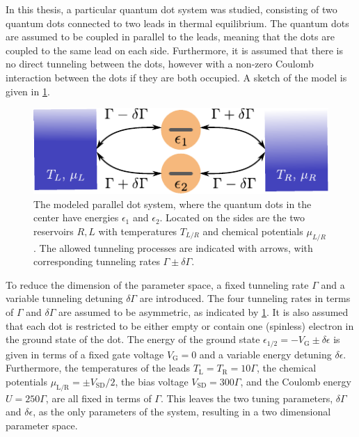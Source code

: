 \documentclass[../main.tex]{subfiles}
\begin{document}
In this thesis, a particular quantum dot system was studied, consisting of two quantum dots connected to two leads in thermal equilibrium. The quantum dots are assumed to be coupled in parallel to the leads, meaning that the dots are coupled to the same lead on each side. Furthermore, it is assumed that there is no direct tunneling between the dots, however with a non-zero Coulomb interaction between the dots if they are both occupied. A sketch of the model is given in \cref{fig:model}.
\begin{figure}[H] \centering
    \includegraphics[width=0.8\linewidth]{figures/model.pdf}
    \caption{The modeled parallel dot system, where the quantum dots in the center have energies $\epsilon_1$ and $\epsilon_2$. Located on the sides are the two reservoirs $R,L$ with temperatures $T_{L/R}$ and chemical potentials $\mu_{L/R}$. The allowed tunneling processes are indicated with arrows, with corresponding tunneling rates $\Gamma \pm \delta\Gamma$.}
    \label{fig:model}
\end{figure}
To reduce the dimension of the parameter space, a fixed tunneling rate $\Gamma$ and a variable tunneling detuning $\delta\Gamma$ are introduced. The four tunneling rates in terms of $\Gamma$ and $\delta\Gamma$ are assumed to be asymmetric, as indicated by \cref{fig:model}. It is also assumed that each dot is restricted to be either empty or contain one (spinless) electron in the ground state of the dot. The energy of the ground state $\epsilon_{1/2} = -V_\text{G} \pm \delta\epsilon$ is given in terms of a fixed gate voltage $V_\text{G}=0$ and a variable energy detuning $\delta\epsilon$.  Furthermore, the temperatures of the leads $T_\text{L}=T_\text{R}=10\Gamma$, the chemical potentials $\mu_\text{L/R} = \pm V_\text{SD}/2$, the bias voltage $V_\text{SD} = 300\Gamma$, and the Coulomb energy $U = 250\Gamma$, are all fixed in terms of $\Gamma$. This leaves the two tuning parameters, $\delta\Gamma$ and $\delta\epsilon$, as the only parameters of the system, resulting in a two dimensional parameter space. 
\end{document}
